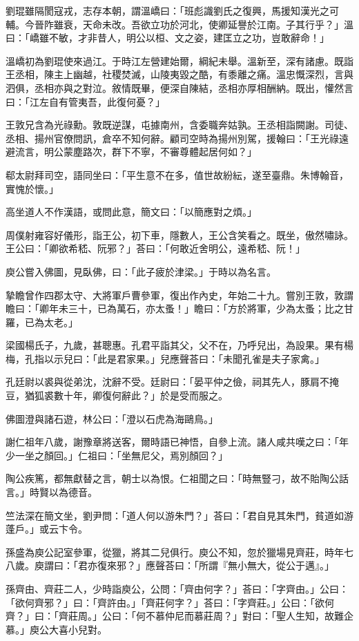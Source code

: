 劉琨雖隔閡寇戎，志存本朝，謂溫嶠曰：「班彪識劉氏之復興，馬援知漢光之可輔。今晉阼雖衰，天命未改。吾欲立功於河北，使卿延譽於江南。子其行乎？」溫曰：「嶠雖不敏，才非昔人，明公以桓、文之姿，建匡立之功，豈敢辭命！」

溫嶠初為劉琨使來過江。于時江左營建始爾，綱紀未舉。溫新至，深有諸慮。既詣王丞相，陳主上幽越，社稷焚滅，山陵夷毀之酷，有黍離之痛。溫忠慨深烈，言與泗俱，丞相亦與之對泣。敘情既畢，便深自陳結，丞相亦厚相酬納。既出，懽然言曰：「江左自有管夷吾，此復何憂？」

王敦兄含為光祿勳。敦既逆謀，屯據南州，含委職奔姑孰。王丞相詣闕謝。司徒、丞相、揚州官僚問訊，倉卒不知何辭。顧司空時為揚州別駕，援翰曰：「王光祿遠避流言，明公蒙塵路次，群下不寧，不審尊體起居何如？」

郗太尉拜司空，語同坐曰：「平生意不在多，值世故紛紜，遂至臺鼎。朱博翰音，實愧於懷。」

高坐道人不作漢語，或問此意，簡文曰：「以簡應對之煩。」

周僕射雍容好儀形，詣王公，初下車，隱數人，王公含笑看之。既坐，傲然嘯詠。王公曰：「卿欲希嵇、阮邪？」荅曰：「何敢近舍明公，遠希嵇、阮！」

庾公嘗入佛圖，見臥佛，曰：「此子疲於津梁。」于時以為名言。

摯瞻曾作四郡太守、大將軍戶曹參軍，復出作內史，年始二十九。嘗別王敦，敦謂瞻曰：「卿年未三十，已為萬石，亦太蚤！」瞻曰：「方於將軍，少為太蚤；比之甘羅，已為太老。」

梁國楊氏子，九歲，甚聰惠。孔君平詣其父，父不在，乃呼兒出，為設果。果有楊梅，孔指以示兒曰：「此是君家果。」兒應聲荅曰：「未聞孔雀是夫子家禽。」

孔廷尉以裘與從弟沈，沈辭不受。廷尉曰：「晏平仲之儉，祠其先人，豚肩不掩豆，猶狐裘數十年，卿復何辭此？」於是受而服之。

佛圖澄與諸石遊，林公曰：「澄以石虎為海鷗鳥。」

謝仁祖年八歲，謝豫章將送客，爾時語已神悟，自參上流。諸人咸共嘆之曰：「年少一坐之顏回。」仁祖曰：「坐無尼父，焉別顏回？」

陶公疾篤，都無獻替之言，朝士以為恨。仁祖聞之曰：「時無豎刁，故不貽陶公話言。」時賢以為德音。

竺法深在簡文坐，劉尹問：「道人何以游朱門？」荅曰：「君自見其朱門，貧道如游蓬戶。」或云卞令。

孫盛為庾公記室參軍，從獵，將其二兒俱行。庾公不知，忽於獵場見齊莊，時年七八歲。庾謂曰：「君亦復來邪？」應聲荅曰：「所謂『無小無大，從公于邁』。」

孫齊由、齊莊二人，少時詣庾公，公問：「齊由何字？」荅曰：「字齊由。」公曰：「欲何齊邪？」曰：「齊許由。」「齊莊何字？」荅曰：「字齊莊。」公曰：「欲何齊？」曰：「齊莊周。」公曰：「何不慕仲尼而慕莊周？」對曰：「聖人生知，故難企慕。」庾公大喜小兒對。

